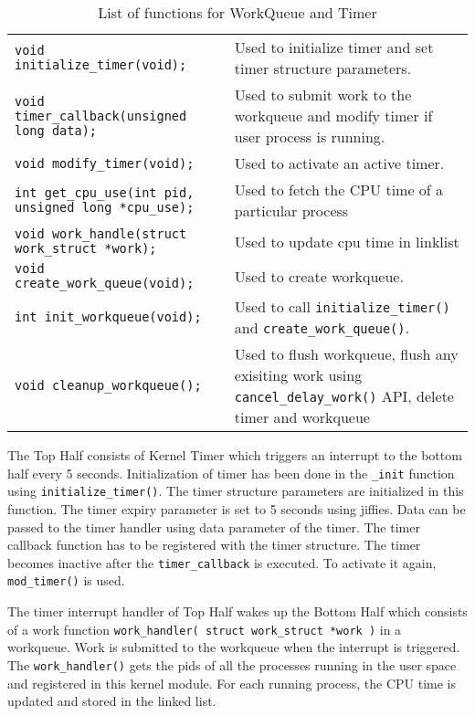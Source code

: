 \documentclass[11pt]{article}
\begin{document}
\begin{table*}[h]
  \centering
  \rcow
  \caption{List of functions for WorkQueue and Timer\label{table:worktable}}
  \begin{tabular}{|p{7cm}|p{8cm}|}
    {\tt void initialize\_timer(void);}  &  Used to initialize timer and set timer structure parameters.  \\
    {\tt void timer\_callback(unsigned long data);}     &  Used to submit work to the workqueue and modify timer if user process is running.  \\
    {\tt void modify\_timer(void);} &  Used to activate an active timer.\\
    {\tt int get\_cpu\_use(int pid, unsigned long *cpu\_use);}   &  Used to fetch the CPU time of a particular process\\
    {\tt void work\_handle(struct work\_struct *work);}  & Used to update cpu time in linklist \\
    {\tt void create\_work\_queue(void);}   & Used to create workqueue.\\
    {\tt int init\_workqueue(void);}    &   Used to call {\tt initialize\_timer()} and {\tt create\_work\_queue()}. \\
    {\tt void cleanup\_workqueue();}    & Used to flush workqueue, flush any exisiting work using {\tt cancel\_delay\_work()} API, delete timer and workqueue\\
  \end{tabular}
\end{table*}

The Top Half consists of Kernel Timer which triggers an interrupt to the bottom half every 5 seconds. Initialization of timer has been done in the {\tt \_init} function using {\tt initialize\_timer()}. The timer structure parameters are initialized in this function. The timer expiry parameter is set to 5 seconds using jiffies. Data can be passed to the timer handler using data parameter of the timer. The timer callback function has to be registered with the timer structure. The timer becomes inactive after the {\tt timer\_callback} is executed. To activate it again, {\tt mod\_timer()} is used.

The timer interrupt handler of Top Half wakes up the Bottom Half which consists of a work function {\tt work\_handler( struct work\_struct *work )} in a workqueue. Work is submitted to the workqueue when the interrupt is triggered. The {\tt work\_handler()} gets the pids of all the processes running in the user space and registered in this kernel module. For each running process, the CPU time is updated and stored in the linked list.
\end{document}
